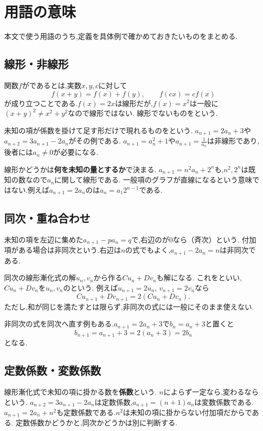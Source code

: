 
\section{用語の意味}\label{節：用語の意味}
本文で使う用語のうち,定義を具体例で確かめておきたいものをまとめる.

\subsection{線形・非線形}\label{節：線形・非線形}
関数$f$が\textbf{}であるとは,実数$x,y,c$に対して
\[
  f(x+y)=f(x)+f(y),\qquad f(cx)=cf(x)
\]
が成り立つことである.$f(x)=2x$は線形だが,$f(x)=x^2$は一般に$(x+y)^2\ne x^2+y^2$なので線形ではない.
線形でないものを\textbf{}という.

未知の項が係数を掛けて足す形だけで現れるものを\textbf{}という.
$a_{n+1}=2a_n+3$や$a_{n+2}=3a_{n+1}-2a_n$がその例である.
$a_{n+1}=a_n^2+1$や$a_{n+1}=\frac{1}{a_n}$は非線形であり,後者には$a_n\ne0$が必要になる.

線形かどうかは\textbf{何を未知の量とするか}で決まる.
$a_{n+1}=n^2a_n+2^n$も,$n^2,2^n$は既知の数なので$a_n$に関して線形である.
一般項のグラフが直線になるという意味ではない.例えば$a_{n+1}=2a_n$のは$a_n=a_1 2^{n-1}$である.

\subsection{同次・重ね合わせ}\label{節：同次・重ね合わせ}
未知の項を左辺に集めた$a_{n+1}-pa_n=q$で,右辺のが$0$なら\textbf{}（斉次）という.
付加項がある場合は非同次という.右辺は$n$の式でもよく,$a_{n+1}-2a_n=n$は非同次である.

同次の線形漸化式の解$u_n,v_n$から作る$Cu_n+Dv_n$も解になる.
これを\textbf{}といい,$Cu_n+Dv_n$を$u_n,v_n$の\textbf{}という.
例えば$u_{n+1}=2u_n$, $v_{n+1}=2v_n$なら
\[
  Cu_{n+1}+Dv_{n+1}=2(Cu_n+Dv_n).
\]
ただし,和が同じを満たすとは限らず,非同次の式には一般にそのまま使えない.

非同次の式を同次へ直す例もある.$a_{n+1}=2a_n+3$で$b_n=a_n+3$と置くと
\[
  b_{n+1}=a_{n+1}+3=2(a_n+3)=2b_n
\]
となる.

\subsection{定数係数・変数係数}\label{節：定数係数・変数係数}
線形漸化式で未知の項に掛かる数を\textbf{係数}という.
$n$によらず一定なら\textbf{},変わるなら\textbf{}という.
$a_{n+2}=3a_{n+1}-2a_n$は定数係数,$a_{n+1}=(n+1)a_n$は変数係数である.
$a_{n+1}=2a_n+n^2$も定数係数である.$n^2$は未知の項に掛からない付加項だからである.
定数係数かどうかと,同次かどうかは別に判断する.


